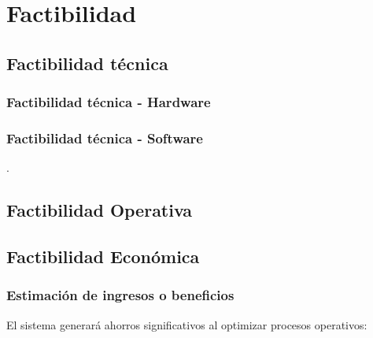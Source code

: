\chapter{Factibilidad}
\section{Factibilidad técnica}
\subsection*{Factibilidad técnica - Hardware}

\subsection*{Factibilidad técnica - Software}
.

\section{Factibilidad Operativa}

\section{Factibilidad Económica}


\subsection{Estimación de ingresos o beneficios}

El sistema generará ahorros significativos al optimizar procesos operativos:

